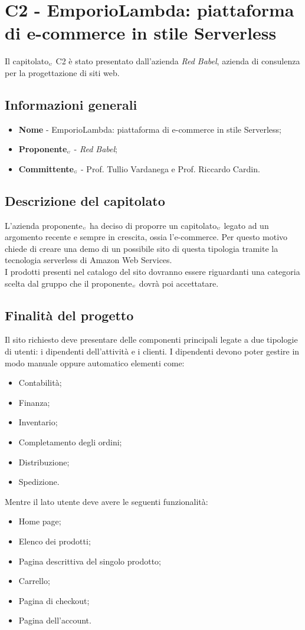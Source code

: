 \chapter{C2 - EmporioLambda: piattaforma di e-commerce in stile Serverless} \label{CapitolatoC2}
Il capitolato$_{\scaleto{G}{3pt}}$ C2 è stato presentato dall'azienda \textit{Red Babel}, azienda di consulenza per la progettazione di siti web.
\section{Informazioni generali} \label{C2InformazioniGenerali}
\begin{itemize}
	\item \textbf{Nome} - EmporioLambda: piattaforma di e-commerce in stile Serverless;
	\item \textbf{Proponente}$_{\scaleto{G}{3pt}}$ - \textit{Red Babel};
	\item \textbf{Committente}$_{\scaleto{G}{3pt}}$ - Prof. Tullio Vardanega e Prof. Riccardo Cardin.
\end{itemize}
\section{Descrizione del capitolato} \label{C2DescrizioneDelCapitolato}
L'azienda proponente$_{\scaleto{G}{3pt}}$ ha deciso di proporre un capitolato$_{\scaleto{G}{3pt}}$ legato ad un argomento recente e sempre in crescita, ossia l'e-commerce. Per questo motivo chiede di creare una demo di un possibile sito di questa tipologia tramite la tecnologia serverless di Amazon Web Services. \\
I prodotti presenti nel catalogo del sito dovranno essere riguardanti una categoria scelta dal gruppo che il proponente$_{\scaleto{G}{3pt}}$ dovrà poi accettatare.
\section{Finalità del progetto} \label{C2FinalitàDelProgetto}
Il sito richiesto deve presentare delle componenti principali legate a due tipologie di utenti: i dipendenti dell'attività e i clienti. I dipendenti devono poter gestire in modo manuale oppure automatico elementi come:
\begin{itemize}
	\item Contabilità;
	\item Finanza;
	\item Inventario;
	\item Completamento degli ordini;
	\item Distribuzione;
	\item Spedizione.
\end{itemize}
Mentre il lato utente deve avere le seguenti funzionalità:
\begin{itemize}
	\item Home page;
	\item Elenco dei prodotti;
	\item Pagina descrittiva del singolo prodotto;
	\item Carrello;
	\item Pagina di checkout;
	\item Pagina dell'account.
\end{itemize}
